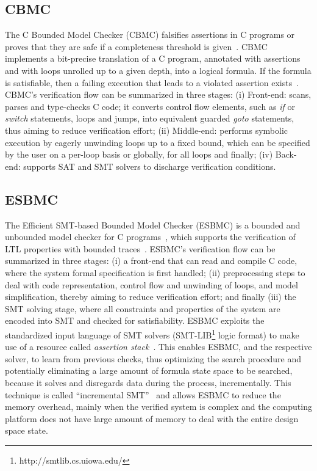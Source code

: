 \subsection{CBMC}
The C Bounded Model Checker (CBMC) falsifies assertions in C programs or proves that they are safe if a completeness threshold is given~\cite{Kroening}. CBMC implements a bit-precise translation of a C program, annotated with assertions and with loops unrolled up to a given depth, into a logical formula. If the formula is satisfiable, then a failing execution that leads to a violated assertion exists~\cite{Kroening}. CBMC's verification flow can be summarized in three stages: (i) Front-end: scans, parses and type-checks C code; it converts control flow elements, such as \textit{if} or \textit{switch} statements, loops and jumps, into equivalent guarded \textit{goto} statements, thus aiming to reduce verification effort; (ii) Middle-end: performs symbolic execution by eagerly unwinding loops up to a fixed bound, which can be specified by the user on a per-loop basis or globally, for all loops and finally; (iv) Back-end: supports SAT and SMT solvers to discharge verification conditions.

\subsection{ESBMC}
The Efficient SMT-based Bounded Model Checker (ESBMC) is a bounded and unbounded model checker for C programs~\cite{esbmc2018}, which supports the verification of LTL properties with bounded traces~\cite{DBLP:journals/sosym/MorseCN015}. ESBMC's verification flow can be summarized in three stages: (i) a front-end that can read and compile C code, where the system formal specification is first handled; (ii) preprocessing steps to deal with code representation, control flow and unwinding of loops, and model simplification, thereby aiming to reduce verification effort; and finally (iii) the SMT solving stage, where all constraints and properties of the system are encoded into SMT and checked for satisfiability. ESBMC exploits the standardized input language of SMT solvers (SMT-LIB\footnote{http://smtlib.cs.uiowa.edu/} logic format) to make use of a resource called \textit{assertion stack}~\cite{Morse2015}. This enables ESBMC, and the respective solver, to learn from previous checks, thus optimizing the search procedure and potentially eliminating a large amount of formula state space to be searched, because it solves and disregards data during the process, incrementally. This technique is called ``incremental SMT''~\cite{DBLP:journals/fac/SchrammelKBMTB17} and allows ESBMC to reduce the memory overhead, mainly when the verified system is complex and the computing platform does not have large amount of memory to deal with the entire design space state.
%
